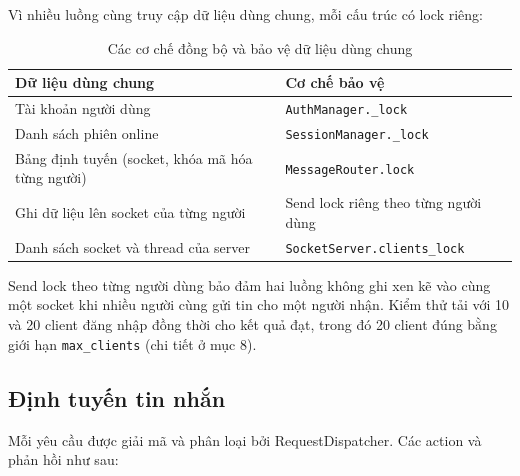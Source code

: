 Vì nhiều luồng cùng truy cập dữ liệu dùng chung, mỗi cấu trúc có lock riêng:


\begin{table}[H]
    \centering
    \small
    \renewcommand{\arraystretch}{1.3}

    \begin{tabularx}{\textwidth}{
        @{}
        >{\raggedright\arraybackslash}X
        >{\raggedright\arraybackslash}X
        @{}
    }
        \toprule
        \textbf{Dữ liệu dùng chung} & \textbf{Cơ chế bảo vệ} \\
        \midrule

        Tài khoản người dùng
        & \texttt{AuthManager.\_lock} \\

        Danh sách phiên online
        & \texttt{SessionManager.\_lock} \\

        Bảng định tuyến (socket, khóa mã hóa từng người)
        & \texttt{MessageRouter.lock} \\

        Ghi dữ liệu lên socket của từng người
        & Send lock riêng theo từng người dùng \\

        Danh sách socket và thread của server
        & \texttt{SocketServer.clients\_lock} \\

        \bottomrule
    \end{tabularx}
    \caption{Các cơ chế đồng bộ và bảo vệ dữ liệu dùng chung}
\end{table}


Send lock theo từng người dùng bảo đảm hai luồng không ghi xen kẽ vào cùng một socket khi nhiều người cùng gửi tin cho một người nhận. Kiểm thử tải với 10 và 20 client đăng nhập đồng thời cho kết quả đạt, trong đó 20 client đúng bằng giới hạn \texttt{max\_clients} (chi tiết ở mục 8).

\subsection{Định tuyến tin nhắn}
Mỗi yêu cầu được giải mã và phân loại bởi RequestDispatcher. Các action và phản hồi như sau:


